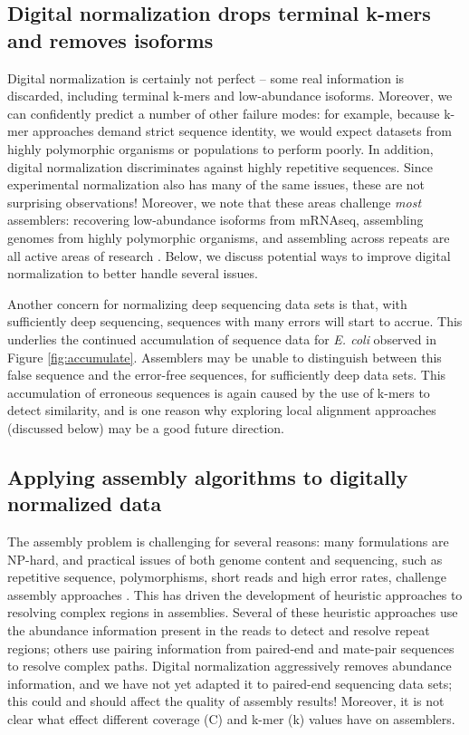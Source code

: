 \documentclass{pnastwo}
\begin{document}
\begin{article}

\subsection{Digital normalization drops terminal k-mers and removes isoforms}

Digital normalization is certainly not perfect -- some real
information is discarded, including terminal k-mers and low-abundance
isoforms.  Moreover, we can confidently predict a number of other
failure modes: for example, because k-mer approaches demand strict
sequence identity, we would expect datasets from highly polymorphic
organisms or populations to perform poorly.  In addition, digital
normalization discriminates against highly repetitive sequences. Since
experimental normalization also has many of the same issues, these are
not surprising observations!  Moreover, we note that these areas
challenge {\em most} assemblers: recovering low-abundance isoforms
from mRNAseq, assembling genomes from highly polymorphic organisms,
and assembling across repeats are all active areas of research
\cite{pubmed18549302,pubmed20633259,pubmed18541131}.  Below, we
discuss potential ways to improve digital normalization to better
handle several issues.

Another concern for normalizing deep sequencing data sets is that,
with sufficiently deep sequencing, sequences with many errors will
start to accrue.  This underlies the continued accumulation of
sequence data for {\em E. coli} observed in Figure
\ref{fig:accumulate}.  Assemblers may be unable to distinguish between
this false sequence and the error-free sequences, for sufficiently
deep data sets.  This accumulation of erroneous sequences is again
caused by the use of k-mers to detect similarity, and is one reason
why exploring local alignment approaches (discussed below) may be a
good future direction.

\subsection{Applying assembly algorithms to digitally normalized data}

The assembly problem is challenging for several reasons: many
formulations are NP-hard, and practical issues of both genome content
and sequencing, such as repetitive sequence, polymorphisms, short
reads and high error rates, challenge assembly approaches
\cite{pubmed19580519}.  This has driven the development of heuristic
approaches to resolving complex regions in assemblies.  Several of
these heuristic approaches use the abundance information present in
the reads to detect and resolve repeat regions; others use pairing
information from paired-end and mate-pair sequences to resolve complex
paths.  Digital normalization aggressively removes abundance
information, and we have not yet adapted it to paired-end sequencing
data sets; this could and should affect the quality of assembly
results! Moreover, it is not clear what effect different coverage (C)
and k-mer (k) values have on assemblers.


\end{article}
\end{document}
